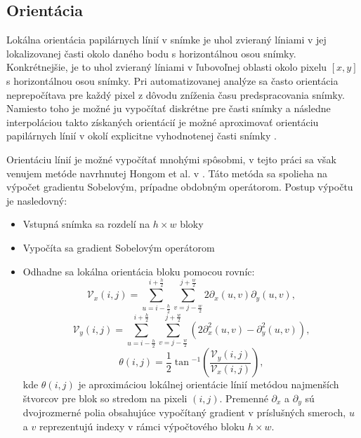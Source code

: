   \subsection{Orientácia} \label{sec:orientacia}
  Lokálna orientácia papilárnych línií v snímke je uhol zvieraný líniami v jej lokalizovanej časti okolo daného bodu
  s horizontálnou osou snímky. Konkrétnejšie, je to uhol zvieraný líniami v ľubovoľnej oblasti okolo pixelu $[x,y]$ s
  horizontálnou osou snímky. Pri automatizovanej analýze sa často orientácia neprepočítava pre každý pixel z dôvodu zníženia času predspracovania snímky.
  Namiesto toho je možné ju vypočítať diskrétne pre časti snímky a následne interpoláciou takto získaných orientácií je možné aproximovať
  orientáciu papilárnych línií v okolí explicitne vyhodnotenej časti snímky \cite{Handbook}.

  Orientáciu línií je možné vypočítať mnohými spôsobmi, v tejto práci sa však venujem metóde navrhnutej Hongom et al. v \cite{Hong}.
  Táto metóda sa spolieha na výpočet gradientu Sobelovým, prípadne obdobným operátorom. Postup výpočtu je nasledovný:
  \begin{itemize}
    \item Vstupná snímka sa rozdelí na $h \times w$ bloky
    \item Vypočíta sa gradient Sobelovým operátorom
    \item Odhadne sa lokálna orientácia bloku pomocou rovníc:
          \begin{equation}
            \mathcal{V}_x(i,j) = \sum_{u=i-\frac{h}{2}}^{i+\frac{h}{2}}\sum_{v=j-\frac{w}{2}}^{j+\frac{w}{2}} 2\partial _{x}(u,v) \partial _y(u,v),
          \end{equation}
          \begin{equation}
            \mathcal{V}_y(i,j) = \sum_{u=i-\frac{h}{2}}^{i+\frac{h}{2}}\sum_{v=j-\frac{w}{2}}^{j+\frac{w}{2}} (2\partial ^{2}_{x}(u,v) - \partial ^{2}_{y}(u,v)),
          \end{equation}
          \begin{equation}
            \theta{}(i,j) = \frac{1}{2}\tan{}^{-1}(\frac{\mathcal{V}_y(i,j)}{\mathcal{V}_x(i,j)}),
          \end{equation}
          kde $\theta{}(i,j)$ je aproximáciou lokálnej orientácie línií metódou najmenších štvorcov pre blok so stredom na pixeli $(i,j)$. Premenné
          $\partial _{x}$ a $\partial _{y}$ sú dvojrozmerné polia obsahujúce vypočítaný gradient v príslušných smeroch, $u$ a $v$ reprezentujú indexy v rámci
          výpočtového bloku $h \times w$.
  \end{itemize}

